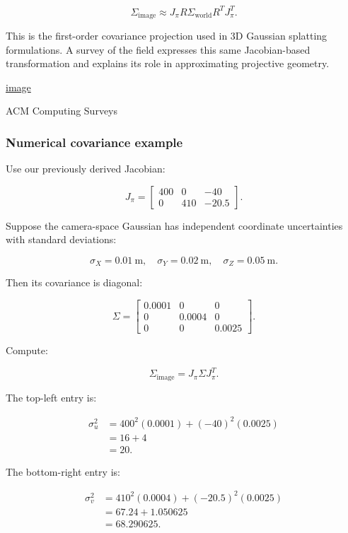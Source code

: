 \[
\boxed{ \Sigma_{\text{image}} \approx J_\pi R\Sigma_{\text{world}}R^TJ_\pi^T }.
\]

This is the first-order covariance projection used in 3D Gaussian splatting formulations. A survey of the field expresses this same Jacobian-based transformation and explains its role in approximating projective geometry. 

\href{https://www.google.com/s2/favicons?domain=https://doi.org&sz=32}{image}

ACM Computing Surveys

\subsubsection{Numerical covariance example}\label{02-foundations-ii-ch021-numerical-covariance-example}

\hypertarget{02-foundations-ii-ch021-numerical-covariance-example}{}

Use our previously derived Jacobian:

\[
J_\pi= \begin{bmatrix} 400&0&-40\\ 0&410&-20.5 \end{bmatrix}.
\]

Suppose the camera-space Gaussian has independent coordinate uncertainties with standard deviations:

\[
\sigma_X=0.01\ \mathrm m,\quad \sigma_Y=0.02\ \mathrm m,\quad \sigma_Z=0.05\ \mathrm m.
\]

Then its covariance is diagonal:

\[
\Sigma= \begin{bmatrix} 0.0001&0&0\\ 0&0.0004&0\\ 0&0&0.0025 \end{bmatrix}.
\]

Compute:

\[
\Sigma_{\text{image}}=J_\pi\Sigma J_\pi^T.
\]

The top-left entry is:

\[
\begin{aligned} \sigma_u^2 &=400^2(0.0001)+(-40)^2(0.0025)\\ &=16+4\\ &=\boxed{20}. \end{aligned}
\]

The bottom-right entry is:

\[
\begin{aligned} \sigma_v^2 &=410^2(0.0004)+(-20.5)^2(0.0025)\\ &=67.24+1.050625\\ &=\boxed{68.290625}. \end{aligned}
\]


